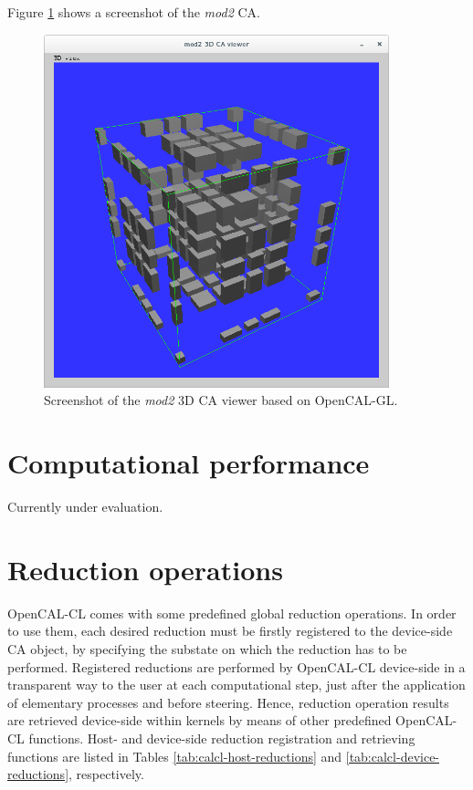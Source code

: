 Figure \ref{fig:calgl_mod2} shows a screenshot of the \emph{mod2} CA.

\begin{figure}
  \begin{center}
    \includegraphics[width=10cm]{./images/OpenCAL/calgl_mod2}
    \caption{Screenshot of the \emph{mod2} 3D CA viewer based on
      OpenCAL-GL.}
    \label{fig:calgl_mod2}
  \end{center}
\end{figure}


\section{Computational performance}
Currently under evaluation.


\section{Reduction operations}
OpenCAL-CL comes with some predefined global reduction operations. In
order to use them, each desired reduction must be firstly registered
to the device-side CA object, by specifying the substate on which the
reduction has to be performed. Registered reductions are performed by
OpenCAL-CL device-side in a transparent way to the user at each
computational step, just after the application of elementary processes
and before steering. Hence, reduction operation results are
retrieved device-side within kernels by means of other predefined
OpenCAL-CL functions. Host- and device-side reduction registration and
retrieving functions are listed in Tables
\ref{tab:calcl-host-reductions} and \ref{tab:calcl-device-reductions},
respectively.


